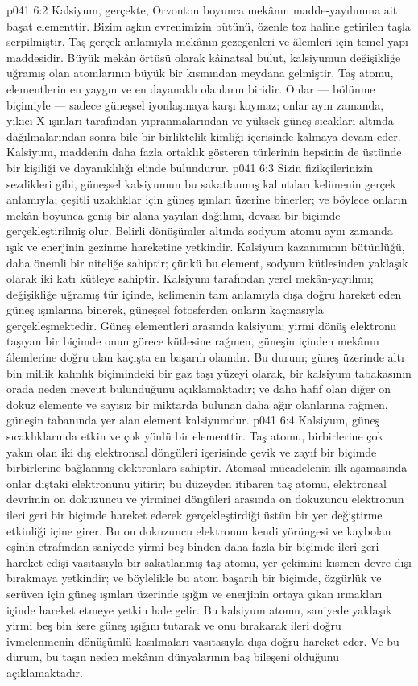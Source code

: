 \vs p041 6:2 Kalsiyum, gerçekte, Orvonton boyunca mekânın madde\hyp{}yayılımına ait başat elementtir. Bizim aşkın evrenimizin bütünü, özenle toz haline getirilen taşla serpilmiştir. Taş gerçek anlamıyla mekânın gezegenleri ve âlemleri için temel yapı maddesidir. Büyük mekân örtüsü olarak kâinatsal bulut, kalsiyumun değişikliğe uğramış olan atomlarının büyük bir kısmından meydana gelmiştir. Taş atomu, elementlerin en yaygın ve en dayanaklı olanların biridir. Onlar --- bölünme biçimiyle --- sadece güneşsel iyonlaşmaya karşı koymaz; onlar aynı zamanda, yıkıcı X\hyp{}ışınları tarafından yıpranmalarından ve yüksek güneş sıcakları altında dağılmalarından sonra bile bir birliktelik kimliği içerisinde kalmaya devam eder. Kalsiyum, maddenin daha fazla ortaklık gösteren türlerinin hepsinin de üstünde bir kişiliği ve dayanıklılığı elinde bulundurur.
\vs p041 6:3 Sizin fizikçilerinizin sezdikleri gibi, güneşsel kalsiyumun bu sakatlanmış kalıntıları kelimenin gerçek anlamıyla; çeşitli uzaklıklar için güneş ışınları üzerine binerler; ve böylece onların mekân boyunca geniş bir alana yayılan dağılımı, devasa bir biçimde gerçekleştirilmiş olur. Belirli dönüşümler altında sodyum atomu aynı zamanda ışık ve enerjinin gezinme hareketine yetkindir. Kalsiyum kazanımının bütünlüğü, daha önemli bir niteliğe sahiptir; çünkü bu element, sodyum kütlesinden yaklaşık olarak iki katı kütleye sahiptir. Kalsiyum tarafından yerel mekân\hyp{}yayılımı; değişikliğe uğramış tür içinde, kelimenin tam anlamıyla dışa doğru hareket eden güneş ışınlarına binerek, güneşsel fotosferden onların kaçmasıyla gerçekleşmektedir. Güneş elementleri arasında kalsiyum; yirmi dönüş elektronu taşıyan bir biçimde onun görece kütlesine rağmen, güneşin içinden mekânın âlemlerine doğru olan kaçışta en başarılı olanıdır. Bu durum; güneş üzerinde altı bin millik kalınlık biçimindeki bir gaz taşı yüzeyi olarak, bir kalsiyum tabakasının orada neden mevcut bulunduğunu açıklamaktadır; ve daha hafif olan diğer on dokuz elemente ve sayısız bir miktarda bulunan daha ağır olanlarına rağmen, güneşin tabanında yer alan element kalsiyumdur.
\vs p041 6:4 Kalsiyum, güneş sıcaklıklarında etkin ve çok yönlü bir elementtir. Taş atomu, birbirlerine çok yakın olan iki dış elektronsal döngüleri içerisinde çevik ve zayıf bir biçimde birbirlerine bağlanmış elektronlara sahiptir. Atomsal mücadelenin ilk aşamasında onlar dıştaki elektronunu yitirir; bu düzeyden itibaren taş atomu, elektronsal devrimin on dokuzuncu ve yirminci döngüleri arasında on dokuzuncu elektronun ileri geri bir biçimde hareket ederek gerçekleştirdiği üstün bir yer değiştirme etkinliği içine girer. Bu on dokuzuncu elektronun kendi yörüngesi ve kaybolan eşinin etrafından saniyede yirmi beş binden daha fazla bir biçimde ileri geri hareket edişi vasıtasıyla bir sakatlanmış taş atomu, yer çekimini kısmen devre dışı bırakmaya yetkindir; ve böylelikle bu atom başarılı bir biçimde, özgürlük ve serüven için güneş ışınları üzerinde ışığın ve enerjinin ortaya çıkan ırmakları içinde hareket etmeye yetkin hale gelir. Bu kalsiyum atomu, saniyede yaklaşık yirmi beş bin kere güneş ışığını tutarak ve onu bırakarak ileri doğru ivmelenmenin dönüşümlü kasılmaları vasıtasıyla dışa doğru hareket eder. Ve bu durum, bu taşın neden mekânın dünyalarının baş bileşeni olduğunu açıklamaktadır.
